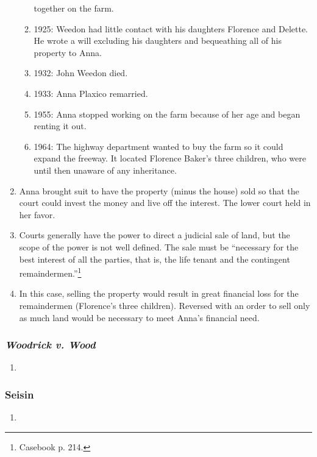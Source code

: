 \begin{enumerate}
\begin{enumerate}
        together on the farm.
        \item 1925: Weedon had little contact with his daughters Florence and 
        Delette. He wrote a will excluding his daughters and bequeathing all 
        of his property to Anna.
        \item 1932: John Weedon died.
        \item 1933: Anna Plaxico remarried.
        \item 1955: Anna stopped working on the farm because of her age and 
        began renting it out.
        \item 1964: The highway department wanted to buy the farm so it could 
        expand the freeway. It located Florence Baker's three children, who 
        were until then unaware of any inheritance.
    \end{enumerate}
    \item Anna brought suit to have the property (minus the house) sold so 
    that the court could invest the money and live off the interest. The lower 
    court held in her favor.
    \item Courts generally have the power to direct a judicial sale of land, 
    but the scope of the power is not well defined. The sale must be 
    ``necessary for the best interest of all the parties, that is, the life 
    tenant and the contingent remaindermen.''\footnote{Casebook p. 214.}
    \item In this case, selling the property would result in great financial 
    loss for the remaindermen (Florence's three children). Reversed with an 
    order to sell only as much land would be necessary to meet Anna's 
    financial need.
\end{enumerate}

\subsubsection{\emph{Woodrick v. Wood}}

\begin{enumerate}
    \item %
\end{enumerate}

\subsubsection{Seisin}

\begin{enumerate}
    \item %
\end{enumerate}


